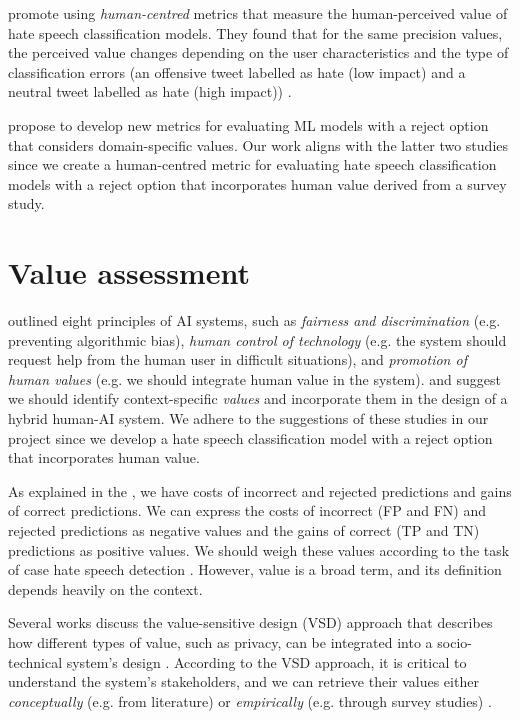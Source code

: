 %
\citet{olteanu2017limits} promote using \textit{human-centred} metrics that measure the human-perceived value of hate speech classification models.
%
They found that for the same precision values, the perceived value changes depending on the user characteristics and the type of classification errors (an offensive tweet labelled as hate (low impact) and a neutral tweet labelled as hate (high impact)) \citep{olteanu2017limits}.
%

%
\citet{casati2021value} propose to develop new metrics for evaluating ML models with a reject option that considers domain-specific values.
%
Our work aligns with the latter two studies since we create a human-centred metric for evaluating hate speech classification models with a reject option that incorporates human value derived from a survey study.


\section{Value assessment}
\label{sec:related-work-value-assessment}
\citet{fjeld2020principled} outlined eight principles of AI systems, such as \emph{fairness and discrimination} (e.g. preventing algorithmic bias), \emph{human control of technology} (e.g. the system should request help from the human user in difficult situations), and \emph{promotion of human values} (e.g. we should integrate human value in the system).
%
\citet{sayin2021science} and \citet{casati2021value} suggest we should identify context-specific \emph{values} and incorporate them in the design of a hybrid human-AI system.
%
We adhere to the suggestions of these studies in our project since we develop a hate speech classification model with a reject option that incorporates human value.
%

%
As explained in the , we have costs of incorrect and rejected predictions and gains of correct predictions.
%
We can express the costs of incorrect (FP and FN) and rejected predictions as negative values and the gains of correct (TP and TN) predictions as positive values.
%
We should weigh these values according to the task of case hate speech detection \citep{sayin2021science}.
%
However, value is a broad term, and its definition depends heavily on the context.
%

%
Several works discuss the value-sensitive design (VSD) approach that describes how different types of value, such as privacy, can be integrated into a socio-technical system's design \citep{zhu2018value, umbrello2021mapping}.
%
According to the VSD approach, it is critical to understand the system's stakeholders, and we can retrieve their values either \emph{conceptually} (e.g. from literature) or \emph{empirically} (e.g. through survey studies) \citep{zhu2018value, umbrello2021mapping}.
%

